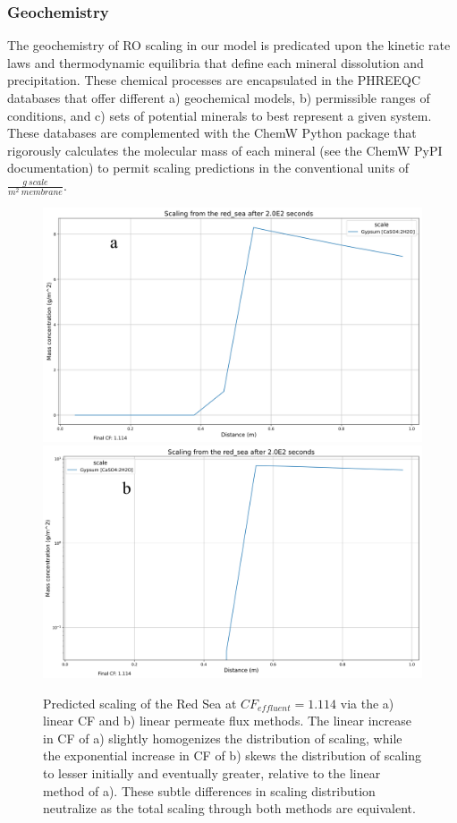 \subsubsection{Geochemistry}
The geochemistry of RO scaling in our model is predicated upon the kinetic rate laws and thermodynamic equilibria that define each mineral dissolution and precipitation. These chemical processes are encapsulated in the PHREEQC databases that offer different a) geochemical models, b) permissible ranges of conditions, and c) sets of potential minerals to best represent a given system. These databases are complemented with the ChemW Python package that rigorously calculates the molecular mass of each mineral (see the ChemW PyPI documentation) to permit scaling predictions in the conventional units of $\frac{g~scale}{m^2~membrane}$.

\begin{figure}[t]
    \centering
    \includegraphics[width=\linewidth]{images/ROSSpy/sensitivity_analyses/permeate_approach/linear_cf.png} \\ \midrule
    \includegraphics[width=\linewidth]{images/ROSSpy/sensitivity_analyses/permeate_approach/linear_permeate.png} 
    \caption{
        Predicted scaling of the Red Sea at $CF_{effluent}=1.114$ via the a) linear CF and b) linear permeate flux methods. The linear increase in CF of a) slightly homogenizes the distribution of scaling, while the exponential increase in CF of b) skews the distribution of scaling to lesser initially and eventually greater, relative to the linear method of a). These subtle differences in scaling distribution neutralize as the total scaling through both methods are equivalent. 
    }
    \label{permeate_approach}
\end{figure}


